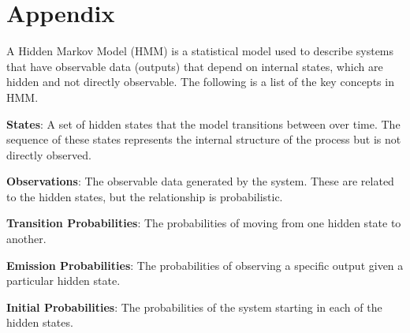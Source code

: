 \documentclass[11pt]{amsart}
\begin{document}
\section*{Appendix}

A Hidden Markov Model (HMM) is a statistical model used to describe systems that have observable data (outputs) that depend on internal states, which are hidden and not directly observable.
The following is a list of the key concepts in HMM.

\textbf{States}: A set of hidden states that the model transitions between over time.
The sequence of these states represents the internal structure of the process but is not directly observed.


\textbf{Observations}: The observable data generated by the system.
These are related to the hidden states, but the relationship is probabilistic.


\textbf{Transition Probabilities}: The probabilities of moving from one hidden state to another.


\textbf{Emission Probabilities}: The probabilities of observing a specific output given a particular hidden state.


\textbf{Initial Probabilities}: The probabilities of the system starting in each of the hidden states.
\end{document}
